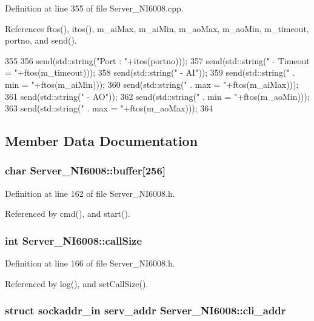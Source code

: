 Definition at line 355 of file Server\_\-NI6008.cpp.

References ftos(), itos(), m\_\-aiMax, m\_\-aiMin, m\_\-aoMax, m\_\-aoMin, m\_\-timeout, portno, and send().


\begin{DoxyCode}
355                            {
356   send(std::string("Port   : "+itos(portno)));
357   send(std::string("   - Timeout = "+ftos(m_timeout)));
358   send(std::string("   - AI"));
359   send(std::string("       . min = "+ftos(m_aiMin)));
360   send(std::string("       . max = "+ftos(m_aiMax)));
361   send(std::string("   - AO"));
362   send(std::string("       . min = "+ftos(m_aoMin)));  
363   send(std::string("       . max = "+ftos(m_aoMax)));
364 }
\end{DoxyCode}


\subsection{Member Data Documentation}
\hypertarget{classServer__NI6008_a2ebf359e55794c1d5ce59900e90b54e6}{
\subsubsection[{buffer}]{\setlength{\rightskip}{0pt plus 5cm}char {\bf Server\_\-NI6008::buffer}\mbox{[}256\mbox{]}}}
\label{classServer__NI6008_a2ebf359e55794c1d5ce59900e90b54e6}


Definition at line 162 of file Server\_\-NI6008.h.

Referenced by cmd(), and start().\hypertarget{classServer__NI6008_a9aa5c02fb85f20452a3f8e0f9dcc33fd}{
\subsubsection[{callSize}]{\setlength{\rightskip}{0pt plus 5cm}int {\bf Server\_\-NI6008::callSize}}}
\label{classServer__NI6008_a9aa5c02fb85f20452a3f8e0f9dcc33fd}


Definition at line 166 of file Server\_\-NI6008.h.

Referenced by log(), and setCallSize().\hypertarget{classServer__NI6008_a8f65891da026492eba6d3642df9e0357}{
\subsubsection[{cli\_\-addr}]{\setlength{\rightskip}{0pt plus 5cm}struct sockaddr\_\-in serv\_\-addr {\bf Server\_\-NI6008::cli\_\-addr}}}
\label{classServer__NI6008_a8f65891da026492eba6d3642df9e0357}


